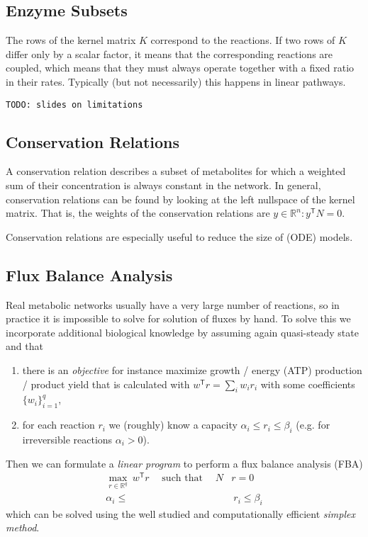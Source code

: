 \documentclass[a4paper]{article}
\newcommand{\todo}[1]{\texttt{TODO: #1}}
\newcommand{\T}{\mathsf{T}}
\DeclareMathOperator{\st}{such~that}
\theoremstyle{plain}
\theoremstyle{definition}
\theoremstyle{remark}
\begin{document}
\subsection{Enzyme Subsets}

The rows of the kernel matrix $K$ correspond to the reactions. If two rows of
$K$ differ only by a scalar factor, it means that the corresponding reactions
are coupled, which means that they must always operate together with a fixed
ratio in their rates. Typically (but not necessarily) this happens in linear
pathways.

\todo{slides on limitations}

\subsection{Conservation Relations}

A conservation relation describes a subset of metabolites for which a weighted
sum of their concentration is always constant in the network. In general,
conservation relations can be found by looking at the left nullspace of the
kernel matrix. That is, the weights of the conservation relations are $y \in
\mathbb{R}^n : y^\T N = 0$.

Conservation relations are especially useful to reduce the size of (ODE)
models.

\subsection{Flux Balance Analysis}

Real metabolic networks usually have a very large number of reactions, so in
practice it is impossible to solve for solution of fluxes by hand. To solve
this we incorporate additional biological knowledge by assuming again
quasi-steady state and that
\begin{enumerate}
  \item there is an \emph{objective} for instance maximize growth / energy
    (ATP) production / product yield that is calculated with $w^\T r = \sum_i
    w_i r_i$ with some coefficients $\{w_i\}_{i=1}^q$,
    
  \item for each reaction $r_i$ we (roughly) know a capacity $\alpha_i \leq
    r_i \leq \beta_i$ (e.g. for irreversible reactions $\alpha_i > 0$).
\end{enumerate}
Then we can formulate a \emph{linear program} to perform a flux balance
analysis (FBA)
\begin{align}
  \tag{FBA} \label{eqn:fba}
  \max_{r \in \mathbb{R}^q} ~ w^\T r \quad \st \quad N&r = 0 \\
       \alpha_i \leq &~r_i \leq \beta_i \nonumber
\end{align}
which can be solved using the well studied and computationally efficient
\emph{simplex method}.
\end{document}
